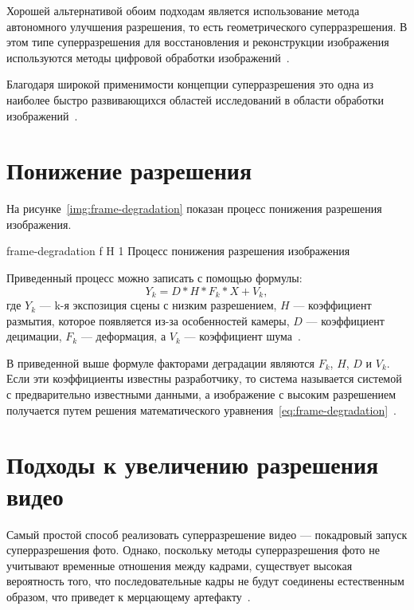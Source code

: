 \documentclass{bmstu}
\begin{document}
Хорошей альтернативой обоим подходам является использование метода автономного улучшения разрешения, то есть геометрического суперразрешения. В этом типе суперразрешения для восстановления и реконструкции изображения используются методы цифровой обработки изображений~\cite{Daithankar2021}.

Благодаря широкой применимости концепции суперразрешения это одна из наиболее быстро развивающихся областей исследований в области обработки изображений~\cite{Yue2016}.

\section{Понижение разрешения}

На рисунке~\ref{img:frame-degradation} показан процесс понижения разрешения изображения.

    {frame-degradation}
    {f}
    {H}
    {1\textwidth}
    {Процесс понижения разрешения изображения~\cite{Daithankar2021}}
    
Приведенный процесс можно записать с помощью формулы:
\begin{equation} 
\label{eq:frame-degradation}
Y_{k} = D * H * F_{k} * X + V_{k},
\end{equation}
где $Y_{k}$ --- k-я экспозиция сцены с низким разрешением, $H$ --- коэффициент размытия, которое появляется из-за особенностей камеры, $D$ --- коэффициент децимации, $F_{k}$ --- деформация, а $V_{k}$ --- коэффициент шума~\cite{Daithankar2021}.

В приведенной выше формуле факторами деградации являются $F_{k}$, $H$, $D$ и $V_{k}$. 
Если эти коэффициенты известны разработчику, то система называется системой с предварительно известными данными, а изображение с высоким разрешением получается путем решения математического уравнения~\ref{eq:frame-degradation}~\cite{Daithankar2021}.

\section{Подходы к увеличению разрешения видео}

Самый простой способ реализовать суперразрешение видео --- покадровый запуск суперразрешения фото. 
Однако, поскольку методы суперразрешения фото не учитывают временные отношения между кадрами, существует высокая вероятность того, что последовательные кадры не будут соединены естественным образом, что приведет к мерцающему артефакту~\cite{Younghyun2018}.
\end{document}
